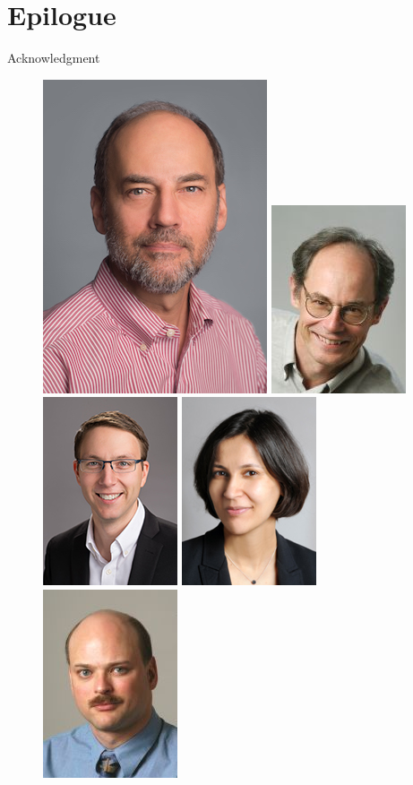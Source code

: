 \section{Epilogue}

\begin{frame}{Acknowledgment}

  \begin{figure}
    \includegraphics[width=0.15\linewidth]{figures/lee.jpg}
    \pause
    \hfill
    \includegraphics[width=0.15\linewidth]{figures/wawrzynek.jpg}
    \hfill
    \includegraphics[width=0.15\linewidth]{figures/hartmann.jpg}
    \hfill
    \includegraphics[width=0.15\linewidth]{figures/ratnasamy.jpg}
    \hfill
    \includegraphics[width=0.15\linewidth]{figures/kubiatowicz.jpg}
    \hfill
  \end{figure}


\end{frame}
